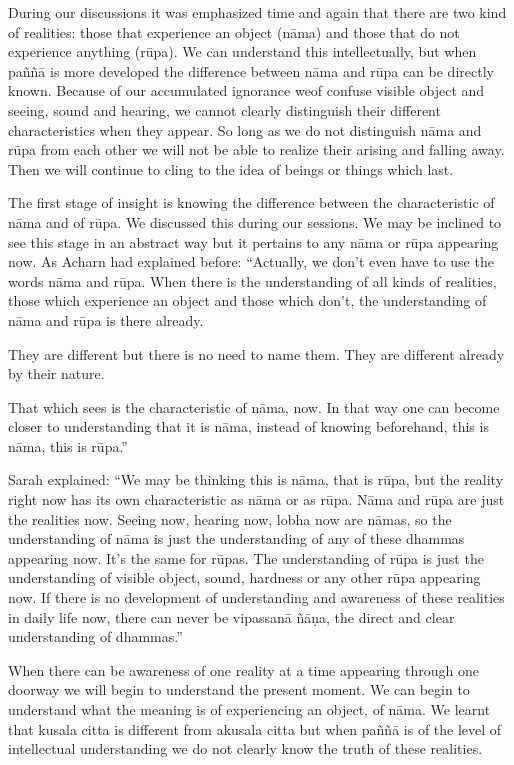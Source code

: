 \documentclass{book}
\begin{document}
During our discussions it was emphasized
time and again that there are two kind of realities: those that
experience an object (nāma) and those that do not experience anything
(rūpa). We can understand this intellectually, but when paññā is more
developed the difference between nāma and rūpa can be directly known.
Because of our accumulated ignorance weof
confuse visible object and seeing, sound and hearing, we cannot clearly
distinguish their different characteristics when they appear. So long as
we do not distinguish nāma
and rūpa from each other we will not be
able to realize their arising and falling away. Then we will continue to
cling to the idea of beings or things which last. 

The first stage of insight is knowing the
difference between the characteristic of nāma and of rūpa. We discussed
this during our sessions. We may be inclined to see this stage in an
abstract way but it pertains to any nāma or rūpa appearing now. As
Acharn had explained before: ``Actually,
we don't even have to use the words
nāma and
rūpa. When there is the
understanding of all kinds
of realities, those which experience an object and those which don't,
the understanding of nāma and
rūpa is there already.

They are
different but there is no
need to name them. They are different already by their nature. 

That which sees is the
characteristic of nāma, now.
In that way one can become closer to understanding that it is
nāma, instead of knowing
beforehand, this is nāma,
this is rūpa.''

Sarah explained:
``We may be thinking this is
nāma, that is
rūpa, but the reality right
now has its own characteristic as
nāma or as
rūpa.
Nāma and
rūpa are just the realities now.
Seeing now, hearing now, lobha now are
nāmas, so the understanding of
nāma is just the understanding of
any of these dhammas
appearing now. It's the same for
rūpas. The understanding of
rūpa is just the understanding of
visible object, sound, hardness or any other
rūpa appearing now.
If there is no development of
understanding and awareness of these realities in daily life now, there
can never be vipassanā
ñāṇa, the direct and
clear understanding of dhammas.''

When there can be
awareness of one reality at a time appearing through one doorway we will
begin to understand the present moment. We can begin to
understand what the meaning is of experiencing an object, of nāma. We
learnt that kusala citta is different from akusala citta but when paññā
is of the level of intellectual understanding we do not clearly know the
truth of these realities. 
\end{document}
